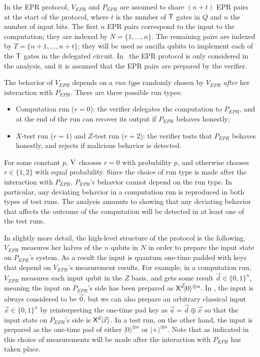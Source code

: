 \documentclass{toc}
\newcommand{\ket}[1]{|#1\rangle}
\newcommand{\ver}{\textsc{V}}
\begin{document}
In the EPR protocol, $V_{EPR}$ and $P_{EPR}$ are assumed to share $(n+t)$ EPR pairs at the start of the protocol, where $t$ is the number of $\sf T$ gates in $Q$ and $n$ the number of input bits. 
 The first $n$ EPR pairs correspond to the input to the computation; they are indexed by $N=\{1,\dots,n\}$. The remaining pairs are indexed by $T=\{n+1,\dots,n+t\}$; they will be used as ancilla qubits to  implement each of the $\sf T$ gates in the delegated circuit. 
 In~\cite{broadbent15howtoverify} the EPR protocol is only considered in the analysis, and it is assumed that the EPR pairs are prepared by the verifier.

The behavior of $V_{EPR}$ depends on a \emph{run type} randomly chosen by $V_{EPR}$ \emph{after} her interaction with $P_{EPR}$. There are three possible run types:
\begin{itemize}[nolistsep]
\item Computation run ($r=0$): the verifier delegates the computation to $P_{EPR}$, and at the end of the run can recover its output if $P_{EPR}$ behaves honestly;
\item $X$-test run ($r=1$) and $Z$-test run ($r=2$): the verifier tests that  $P_{EPR}$  behaves honestly, and rejects if malicious behavior is detected.
\end{itemize}
For some constant $p$, $\ver$ chooses $r=0$ with probability $p$, and otherwise chooses $r\in\{1,2\}$ with equal probability. Since the choice of run type is made after the interaction with $P_{EPR}$, $P_{EPR}$'s behavior cannot depend on the run type. In particular, any deviating behavior in a computation run is reproduced in both types of test runs. The analysis amounts to showing that any deviating behavior that affects the outcome of the computation will be detected in at least one of the test runs. 

In slightly more detail, the high-level structure of the protocol is the following. $V_{EPR}$ measures her halves of the $n$ qubits in $N$ in order to prepare the input state on $P_{EPR}$'s system. As a result the input is quantum one-time padded with keys that depend on $V_{EPR}$'s measurement results. For example, in a computation run, $V_{EPR}$ measures each input qubit in the $Z$ basis, and gets some result $\vec{d}\in\{0,1\}^n$, meaning the input on $P_{EPR}$'s side has been prepared as ${\sf X}^{\vec{d}}\ket{0}^{\otimes n}$. In \cite{broadbent15howtoverify}, the input is always considered to be $\vec{0}$, but we can also prepare an arbitrary classical input $\vec{x}\in\{0,1\}^n$ by reinterpreting the one-time pad key as $\vec{a}=\vec{d}\oplus \vec{x}$ so that the input state on $P_{EPR}$'s side is ${\sf X}^{\vec{a}}\ket{\vec{x}}$. In a test run, on the other hand, the input is prepared as the one-time pad of either $\ket{0}^{\otimes n}$ or $\ket{+}^{\otimes n}$. Note that as indicated in  this choice of measurements will be made after the interaction with $P_{EPR}$ has taken place.
\end{document}
